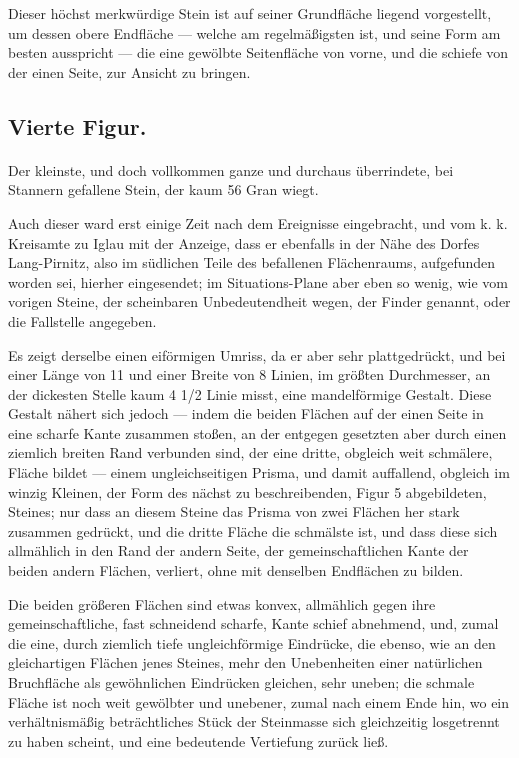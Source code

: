 \documentclass[a4paper, 11pt, oneside, german]{article}
\begin{document}
Dieser höchst merkwürdige Stein ist auf seiner Grundfläche liegend vorgestellt, um dessen obere Endfläche --- welche am regelmäßigsten ist, und seine Form am besten ausspricht --- die eine gewölbte Seitenfläche von vorne, und die schiefe von der einen Seite, zur Ansicht zu bringen.

\subsection{Vierte Figur.}
\paragraph{}
Der kleinste, und doch vollkommen ganze und durchaus überrindete, bei Stannern gefallene Stein, der kaum 56 Gran wiegt.

Auch dieser ward erst einige Zeit nach dem Ereignisse eingebracht, und vom k. k. Kreisamte zu Iglau mit der Anzeige, dass er ebenfalls in der Nähe des Dorfes Lang-Pirnitz, also im südlichen Teile des befallenen Flächenraums, aufgefunden worden sei, hierher eingesendet; im Situations-Plane aber eben so wenig, wie vom vorigen Steine, der scheinbaren Unbedeutendheit wegen, der Finder genannt, oder die Fallstelle angegeben.

Es zeigt derselbe einen eiförmigen Umriss, da er aber sehr plattgedrückt, und bei einer Länge von 11 und einer Breite von 8 Linien, im größten Durchmesser, an der dickesten Stelle kaum 4 1/2 Linie misst, eine mandelförmige Gestalt. Diese Gestalt nähert sich jedoch --- indem die beiden Flächen auf der einen Seite in eine scharfe Kante zusammen stoßen, an der entgegen gesetzten aber durch einen ziemlich breiten Rand verbunden sind, der eine dritte, obgleich weit schmälere, Fläche bildet --- einem ungleichseitigen Prisma, und damit auffallend, obgleich im winzig Kleinen, der Form des nächst zu beschreibenden, Figur 5 abgebildeten, Steines; nur dass an diesem Steine das Prisma von zwei Flächen her stark zusammen gedrückt, und die dritte Fläche die schmälste ist, und dass diese sich allmählich in den Rand der andern Seite, der gemeinschaftlichen Kante der beiden andern Flächen, verliert, ohne mit denselben Endflächen zu bilden.

Die beiden größeren Flächen sind etwas konvex, allmählich gegen ihre gemeinschaftliche, fast schneidend scharfe, Kante schief abnehmend, und, zumal die eine, durch ziemlich tiefe ungleichförmige Eindrücke, die ebenso, wie an den gleichartigen Flächen jenes Steines, mehr den Unebenheiten einer natürlichen Bruchfläche als gewöhnlichen Eindrücken gleichen, sehr uneben; die schmale Fläche ist noch weit gewölbter und unebener, zumal nach einem Ende hin, wo ein verhältnismäßig beträchtliches Stück der Steinmasse sich gleichzeitig losgetrennt zu haben scheint, und eine bedeutende Vertiefung zurück ließ.
\end{document}
